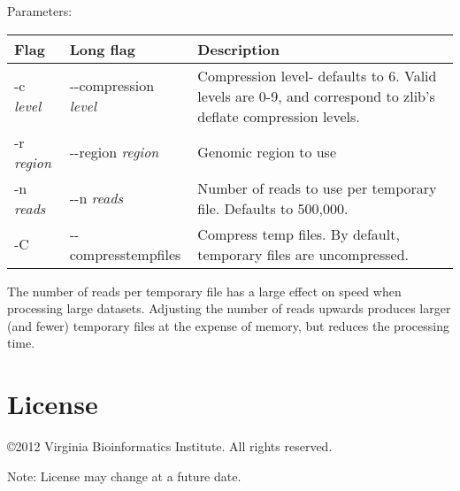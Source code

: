 \documentclass[11pt]{article}
\begin{document}
Parameters:
\begin{center}
\begin{tabular}{llp{3.5in}}
\hline
Flag&Long flag&Description\\ \hline
-c \textit{level}&{-}{-}compression \textit{level}&Compression level- defaults to 6. Valid levels are 0-9, and correspond to zlib's deflate compression levels. \\
-r \textit{region}&{-}{-}region \textit{region}&Genomic region to use\\
-n \textit{reads}&{-}{-}n \textit{reads}&Number of reads to use per temporary file. Defaults to 500,000.\\
-C&{-}{-}compresstempfiles&Compress temp files. By default, temporary files are uncompressed.\\
\end{tabular}
\end{center}

The number of reads per temporary file has a large effect on speed when processing large datasets. Adjusting the number of reads upwards produces larger (and fewer) temporary files at the expense of memory, but reduces the processing time.

\section {License}
\copyright 2012 Virginia Bioinformatics Institute. All rights reserved.

Note: License may change at a future date.
\end{document}
